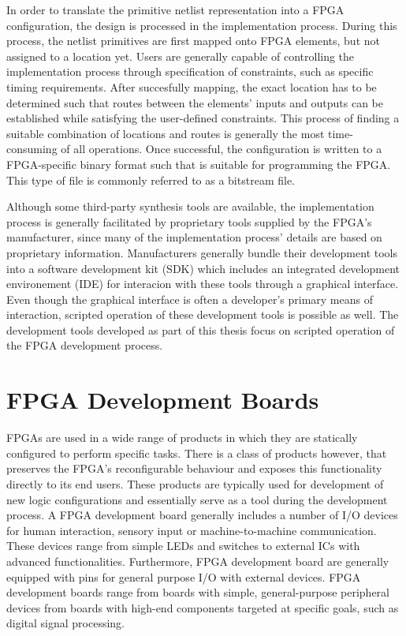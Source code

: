 \documentclass[main.tex]{subfiles}
\begin{document}
In order to translate the primitive netlist representation into a FPGA configuration, the design is processed in the implementation process. During this process, the netlist primitives are first mapped onto FPGA elements, but not assigned to a location yet. Users are generally capable of controlling the implementation process through specification of constraints, such as specific timing requirements. After succesfully mapping, the exact location has to be determined such that routes between the elements' inputs and outputs can be established while satisfying the user-defined constraints. This process of finding a suitable combination of locations and routes is generally the most time-consuming of all operations. Once successful, the configuration is written to a FPGA-specific binary format such that is suitable for programming the FPGA. This type of file is commonly referred to as a bitstream file. 

Although some third-party synthesis tools are available, the implementation process is generally facilitated by proprietary tools supplied by the FPGA's manufacturer, since many of the implementation process' details are based on proprietary information. Manufacturers generally bundle their development tools into a software development kit (SDK) which includes an integrated development environement (IDE) for interacion with these tools through a graphical interface. Even though the graphical interface is often a developer's primary means of interaction, scripted operation of these development tools is possible as well. The development tools developed as part of this thesis focus on scripted operation of the FPGA development process.


\section{FPGA Development Boards}
FPGAs are used in a wide range of products in which they are statically configured to perform specific tasks. There is a class of products however, that preserves the FPGA's reconfigurable behaviour and exposes this functionality directly to its end users. These products are typically used for development of new logic configurations and essentially serve as a tool during the development process. A FPGA development board generally includes a number of I/O devices for human interaction, sensory input or machine-to-machine communication. These devices range from simple LEDs and switches to external ICs with advanced functionalities. Furthermore, FPGA development board are generally equipped with pins for general purpose I/O with external devices. FPGA development boards range from boards with simple, general-purpose peripheral devices from boards with high-end components targeted at specific goals, such as digital signal processing.
\end{document}
